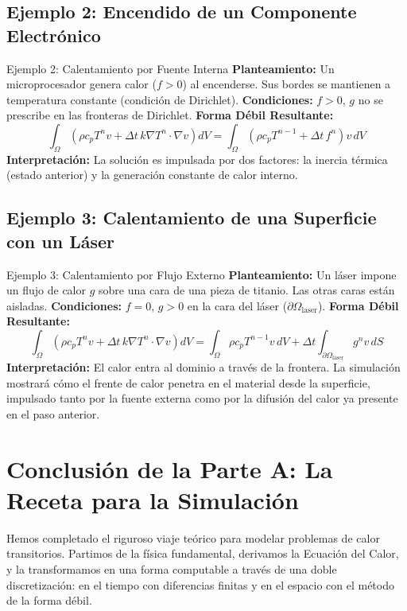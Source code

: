 \documentclass[11pt, a4paper]{article}
\begin{document}
\subsection{Ejemplo 2: Encendido de un Componente Electrónico}
\begin{examplebox}{Ejemplo 2: Calentamiento por Fuente Interna}
    \textbf{Planteamiento:} Un microprocesador genera calor ($f>0$) al encenderse. Sus bordes se mantienen a temperatura constante (condición de Dirichlet).
    \textbf{Condiciones:} $f > 0$, $g$ no se prescribe en las fronteras de Dirichlet.
    \textbf{Forma Débil Resultante:}
    $$ \int_{\Omega} \left( \rho c_p T^n v + \Delta t \, k \nabla T^n \cdot \nabla v \right) dV = \int_{\Omega} \left( \rho c_p T^{n-1} + \Delta t \, f^n \right) v \, dV $$
    \textbf{Interpretación:} La solución es impulsada por dos factores: la inercia térmica (estado anterior) y la generación constante de calor interno.
\end{examplebox}

\subsection{Ejemplo 3: Calentamiento de una Superficie con un Láser}
\begin{examplebox}{Ejemplo 3: Calentamiento por Flujo Externo}
    \textbf{Planteamiento:} Un láser impone un flujo de calor $g$ sobre una cara de una pieza de titanio. Las otras caras están aisladas.
    \textbf{Condiciones:} $f = 0$, $g > 0$ en la cara del láser ($\partial\Omega_{\text{laser}}$).
    \textbf{Forma Débil Resultante:}
    $$ \int_{\Omega} \left( \rho c_p T^n v + \Delta t \, k \nabla T^n \cdot \nabla v \right) dV = \int_{\Omega} \rho c_p T^{n-1} v \, dV + \Delta t \int_{\partial \Omega_{\text{laser}}} g^n v \, dS $$
    \textbf{Interpretación:} El calor entra al dominio a través de la frontera. La simulación mostrará cómo el frente de calor penetra en el material desde la superficie, impulsado tanto por la fuente externa como por la difusión del calor ya presente en el paso anterior.
\end{examplebox}

\section{Conclusión de la Parte A: La Receta para la Simulación}
Hemos completado el riguroso viaje teórico para modelar problemas de calor transitorios. Partimos de la física fundamental, derivamos la Ecuación del Calor, y la transformamos en una forma computable a través de una doble discretización: en el tiempo con diferencias finitas y en el espacio con el método de la forma débil.
\end{document}
